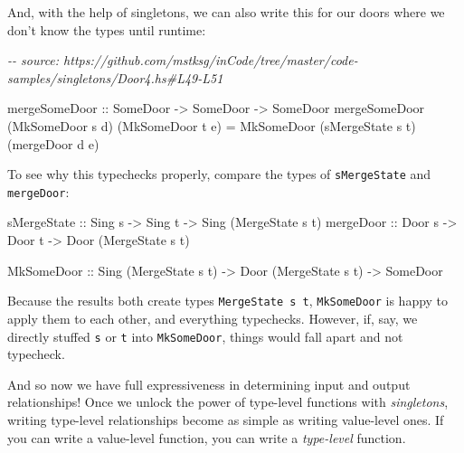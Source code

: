 \documentclass[]{article}
\newenvironment{Shaded}{}{}
\newcommand{\CommentTok}[1]{\textcolor[rgb]{0.38,0.63,0.69}{\textit{#1}}}
\newcommand{\DataTypeTok}[1]{\textcolor[rgb]{0.56,0.13,0.00}{#1}}
\newcommand{\NormalTok}[1]{#1}
\newcommand{\OtherTok}[1]{\textcolor[rgb]{0.00,0.44,0.13}{#1}}
\begin{document}
And, with the help of singletons, we can also write this for our doors where we
don't know the types until runtime:

\begin{Shaded}
\begin{Highlighting}[]
\CommentTok{{-}{-} source: https://github.com/mstksg/inCode/tree/master/code{-}samples/singletons/Door4.hs\#L49{-}L51}

\OtherTok{mergeSomeDoor ::} \DataTypeTok{SomeDoor} \OtherTok{{-}\textgreater{}} \DataTypeTok{SomeDoor} \OtherTok{{-}\textgreater{}} \DataTypeTok{SomeDoor}
\NormalTok{mergeSomeDoor (}\DataTypeTok{MkSomeDoor}\NormalTok{ s d) (}\DataTypeTok{MkSomeDoor}\NormalTok{ t e) }\OtherTok{=}
    \DataTypeTok{MkSomeDoor}\NormalTok{ (sMergeState s t) (mergeDoor d e)}
\end{Highlighting}
\end{Shaded}

To see why this typechecks properly, compare the types of \texttt{sMergeState}
and \texttt{mergeDoor}:

\begin{Shaded}
\begin{Highlighting}[]
\OtherTok{sMergeState ::} \DataTypeTok{Sing}\NormalTok{ s }\OtherTok{{-}\textgreater{}} \DataTypeTok{Sing}\NormalTok{ t }\OtherTok{{-}\textgreater{}} \DataTypeTok{Sing}\NormalTok{ (}\DataTypeTok{MergeState}\NormalTok{ s t)}
\OtherTok{mergeDoor   ::} \DataTypeTok{Door}\NormalTok{ s }\OtherTok{{-}\textgreater{}} \DataTypeTok{Door}\NormalTok{ t }\OtherTok{{-}\textgreater{}} \DataTypeTok{Door}\NormalTok{ (}\DataTypeTok{MergeState}\NormalTok{ s t)}

\DataTypeTok{MkSomeDoor}\OtherTok{  ::} \DataTypeTok{Sing}\NormalTok{ (}\DataTypeTok{MergeState}\NormalTok{ s t) }\OtherTok{{-}\textgreater{}} \DataTypeTok{Door}\NormalTok{ (}\DataTypeTok{MergeState}\NormalTok{ s t) }\OtherTok{{-}\textgreater{}} \DataTypeTok{SomeDoor}
\end{Highlighting}
\end{Shaded}

Because the results both create types \texttt{MergeState\ s\ t},
\texttt{MkSomeDoor} is happy to apply them to each other, and everything
typechecks. However, if, say, we directly stuffed \texttt{s} or \texttt{t} into
\texttt{MkSomeDoor}, things would fall apart and not typecheck.

And so now we have full expressiveness in determining input and output
relationships! Once we unlock the power of type-level functions with
\emph{singletons}, writing type-level relationships become as simple as writing
value-level ones. If you can write a value-level function, you can write a
\emph{type-level} function.
\end{document}
